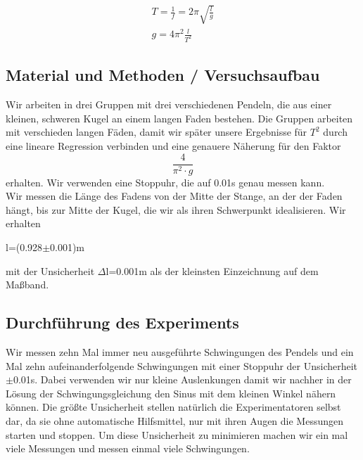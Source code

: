 \documentclass{article}
\begin{document}
\begin{align}
T=\frac{1}{f}=2 \pi\sqrt{\frac{l}{g}} \\
g=4\pi^2\frac{l}{T^2}
\end{align}
\subsection{Material und Methoden / Versuchsaufbau}
Wir arbeiten in drei Gruppen mit drei verschiedenen Pendeln, die aus einer kleinen, schweren Kugel an einem langen Faden bestehen. Die Gruppen arbeiten mit verschieden langen Fäden, damit wir später unsere Ergebnisse für $T^2$ durch eine lineare Regression verbinden und eine genauere Näherung für den Faktor 
\begin{equation*}
\frac{4}{\pi^2 \cdot g} 
\end{equation*} erhalten. 
Wir verwenden eine Stoppuhr, die auf 0.01s genau messen kann.\\
Wir messen die Länge des Fadens von der Mitte der Stange, an der der Faden hängt, bis zur Mitte der Kugel, die wir als ihren Schwerpunkt idealisieren. Wir erhalten \\
 \begin{center}
 l=(0.928$\pm$0.001)m
 \end{center}
 mit der Unsicherheit $\Delta$l=0.001m als der kleinsten Einzeichnung auf dem Maßband.

\subsection{Durchführung des Experiments}
Wir messen zehn Mal immer neu ausgeführte Schwingungen des Pendels und ein Mal zehn aufeinanderfolgende Schwingungen mit einer Stoppuhr der Unsicherheit $\pm$0.01s. Dabei verwenden wir nur kleine Auslenkungen damit wir nachher in der Lösung der Schwingungsgleichung den Sinus mit dem kleinen Winkel nähern können. Die größte Unsicherheit stellen natürlich die Experimentatoren selbst dar, da sie ohne automatische Hilfsmittel, nur mit ihren Augen die Messungen starten und stoppen. Um diese Unsicherheit zu minimieren machen wir ein mal viele Messungen und messen einmal viele Schwingungen.
\end{document}
